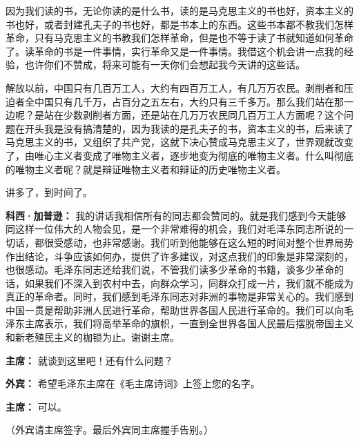 \begin{duihua}
因为我们读的书，无论你读的是什么书，读的是马克思主义的书也好，资本主义的书也好，或者封建孔夫子的书也好，都是书本上的东西。这些书本都不教我们怎样革命，只有马克思主义的书教我们怎样革命，但是也不等于读了书就知道如何革命了。读革命的书是一件事情，实行革命又是一件事情。我借这个机会讲一点我的经验，也许你们不赞成，将来可能有一天你们会想起我今天讲的这些话。

解放以前，中国只有几百万工人，大约有四百万工人，有几万万农民。剥削者和压迫者全中国只有几千万，占百分之五左右，大约只有三千多万。那么我们站在那一边呢？是站在少数剥削者方面，还是站在几万万农民同几百万工人方面呢？这个问题在开头我是没有搞清楚的，因为我读的是孔夫子的书，资本主义的书，后来读了马克思主义的书，又组织了共产党，这就下决心赞成马克思主义了，世界观就改变了，由唯心主义者变成了唯物主义者，逐步地变为彻底的唯物主义者。什么叫彻底的唯物主义者呢？就是辩证唯物主义者和辩证的历史唯物主义者。

讲多了，到时间了。

\item[\textbf{科西·加普逊：}] 我的讲话我相信所有的同志都会赞同的。就是我们感到今天能够同这样一位伟大的人物会见，是一个非常难得的机会，我们对毛泽东同志所说的一切话，都很受感动，也非常感谢。我们听到他能够在这么短的时间对整个世界局势作出结论，斗争应该如何办，提供了许多建议，对这点我们的印象是非常深刻的，也很感动。毛泽东同志还给我们说，不管我们读多少革命的书籍，谈多少革命的话，如果我们不深入到农村中去，向群众学习，同群众打成一片，我们就不能成为真正的革命者。同时，我们感到毛泽东同志对非洲的事物是非常关心的。我们感到中国一贯是帮助非洲人民进行革命，帮助世界各国人民进行革命的。我们可以向毛泽东主席表示，我们将高举革命的旗帜，一直到全世界各国人民最后摆脱帝国主义和新老殖民主义的枷锁为止。谢谢主席。

\item[\textbf{主席：}] 就谈到这里吧！还有什么问题？

\item[\textbf{外宾：}] 希望毛泽东主席在《毛主席诗词》上签上您的名字。

\item[\textbf{主席：}] 可以。

（外宾请主席签字。最后外宾同主席握手告别。）
\end{duihua}
